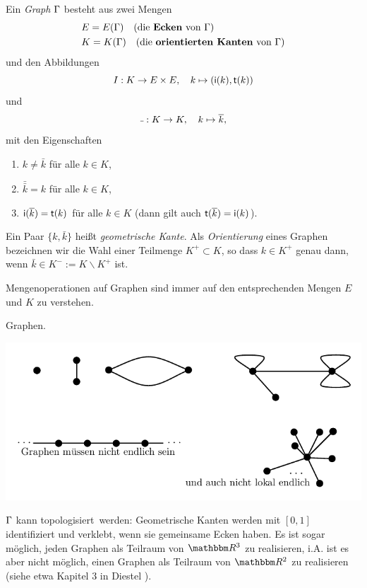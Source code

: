 \documentclass[a4paper, 12pt, twoside]{article}
\begin{document}
\DEF Ein \emph{Graph} $\Gamma$ besteht aus zwei Mengen
\begin{align*}
& E=E(\GR) \quad \text{(die \emph{Ecken}\index{Ecke} von $\GR$)} \\
& K=K(\GR) \quad \text{(die \emph{orientierten Kanten}\index{Kante}\index{orientierte Kanten}\index{Kante!orientiert} von $\GR$)}\index{$\GR$ (Graph)}\index{$E(\GR)$ (Ecken)}\index{$K(\GR)$ (Kanten)}\index{$\ini(k)$, $\ter(k)$}
\end{align*}
und den Abbildungen
\[
I : K \rightarrow E\times E,\quad k \mapsto (\mathsf{i}(k),\mathsf{t}(k))
\]
und
\[
\bar{\ }:K\Ra K,\quad k\mapsto\bar{k},
\]
mit den Eigenschaften
\begin{enumerate}
\item $k\neq \bar{k}$ für alle $k\in K$,
\item $\bar{\bar{k}}=k$ für alle $k\in K$,
\item $\mathsf{i}(\overline{k})=\mathsf{t}(k)$ für alle $k\in K$ (dann gilt auch $\mathsf{t}(\overline{k})=\mathsf{i}(k)$).
\end{enumerate}
Ein Paar $\{k,\bar{k}\}$ heißt \emph{geometrische Kante}.
Als \emph{Orientierung} eines Graphen bezeichnen
wir die Wahl einer Teilmenge $K^+ \subset K$, so dass
$k\in K^+$ genau dann, wenn
$\bar{k}\in K^- := K\backslash K^+$ ist.

Mengenoperationen auf Graphen sind immer auf den entsprechenden
Mengen $E$ und $K$ zu verstehen.

\BSP Graphen.
\begin{center}
	\includegraphics{grugraImages/bspgraphen}
\end{center}

\BEM $\Gamma$ kann \glqq topologisiert\grqq\ werden:
Geometrische Kanten werden mit $[0,1]$ identifiziert und verklebt,
wenn sie gemeinsame Ecken haben. Es ist sogar möglich, jeden
Graphen als Teilraum von $\RR^3$ zu realisieren, i.A. ist es aber nicht möglich, einen Graphen als Teilraum von $\RR^2$ zu realisieren
(siehe etwa Kapitel 3 in Diestel \cite{diestel}).
\end{document}
